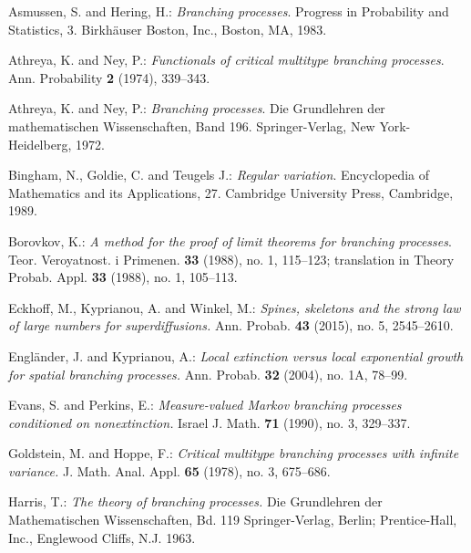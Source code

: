 \documentclass[12pt,a4paper]{amsart}
\theoremstyle{definition}
\numberwithin{equation}{section}
\begin{document}
\begin{thebibliography}{10}
	
	Asmussen, S. and Hering, H.:
	\emph{Branching processes}.
	Progress in Probability and Statistics, 3.
	Birkh{\"a}user Boston, Inc., Boston, MA, 1983.
	
	
	Athreya, K. and Ney, P.:
	\emph{Functionals of critical multitype branching processes}.
	Ann. Probability \textbf{2} (1974), 339--343.


	
	Athreya, K. and Ney, P.:
	\emph{Branching processes}.
	Die Grundlehren der mathematischen Wissenschaften, Band 196.
	Springer-Verlag, New York-Heidelberg, 1972.
	
	
	Bingham, N., Goldie, C. and Teugels J.:
	\emph{Regular variation}.
	Encyclopedia of Mathematics and its Applications, 27.
	Cambridge University Press, Cambridge, 1989.
	
	
	Borovkov, K.:
	\emph{A method for the proof of limit theorems for branching processes}.
	Teor. Veroyatnost. i Primenen. \textbf{33} (1988), no. 1, 115--123;
	translation in Theory Probab. Appl. \textbf{33} (1988), no. 1, 105–113.
	
	
	Eckhoff, M., Kyprianou, A. and Winkel, M.:
	\emph{Spines, skeletons and the strong law of large numbers for superdiffusions.}
	Ann. Probab. \textbf{43} (2015), no. 5, 2545–2610.
	
	
	Engländer, J. and Kyprianou, A.:
	\emph{Local extinction versus local exponential growth for spatial branching processes.}
	Ann. Probab. \textbf{32} (2004), no. 1A, 78–99.
	
	
	Evans, S. and Perkins, E.:
	\emph{Measure-valued Markov branching processes conditioned on nonextinction.}
	Israel J. Math. \textbf{71} (1990), no. 3, 329–337.

	
	Goldstein, M. and Hoppe, F.:
	\emph{Critical multitype branching processes with infinite variance.}
	J. Math. Anal. Appl. \textbf{65} (1978), no. 3, 675–686.
	
	
	Harris, T.:
	\emph{The theory of branching processes.}
	Die Grundlehren der Mathematischen Wissenschaften, Bd. 119 Springer-Verlag, Berlin; Prentice-Hall, Inc., Englewood Cliffs, N.J. 1963.
	

\end{thebibliography}
\end{document}
